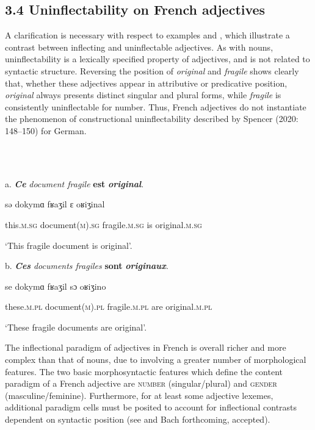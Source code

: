 \documentclass[output=paper]{langscibook}
\begin{document}
\subsection{3.4   Uninflectability on French adjectives}

A clarification is necessary with respect to examples  and , which illustrate a contrast between inflecting and uninflectable adjectives. As with nouns, uninflectability is a lexically specified property of adjectives, and is not related to syntactic structure. Reversing the position of \textit{original} and \textit{fragile}  shows clearly that, whether these adjectives appear in attributive or predicative position, \textit{original} always presents distinct singular and plural forms, while \textit{fragile} is consistently uninflectable for number. Thus, French adjectives do not instantiate the phenomenon of constructional uninflectability described by Spencer (2020: 148–150) for German.

\ea%
    \label{ex:key:3}
    \gll \\
         \\
    \glt
    \z %

          a.   \textbf{\textit{Ce}} \textit{document   fragile}\textbf{    \textbf{est} } \textbf{\textit{original}}.  

    sǝ   dokymɑ  fʁaʒil    ɛ  oʁiʒinal  

    this.\textsc{m.sg} document(\textsc{m})\textsc{.sg}  fragile\textsc{.m.sg}  is original\textsc{.m.sg}

    ‘This fragile document is original’.

  b.   \textbf{\textit{Ces}} \textit{documents  fragiles}\textbf{  \textbf{sont}} \textbf{\textit{originaux}}.  

    se  dokymɑ  fʁaʒil    sɔ  oʁiʒino  

    these.\textsc{m.pl} document(\textsc{m})\textsc{.pl} fragile\textsc{.m.pl}  are original\textsc{.m.pl}

    ‘These fragile documents are original’.

The inflectional paradigm of adjectives in French is overall richer and more complex than that of nouns, due to involving a greater number of morphological features. The two basic morphosyntactic features which define the content paradigm of a French adjective are \textsc{number} (singular/plural) and \textsc{gender} (masculine/feminine). Furthermore, for at least some adjective lexemes, additional paradigm cells must be posited to account for inflectional contrasts dependent on syntactic position (see \citealt{BonamiBoyé2005} and Bach forthcoming, accepted).
\end{document}
